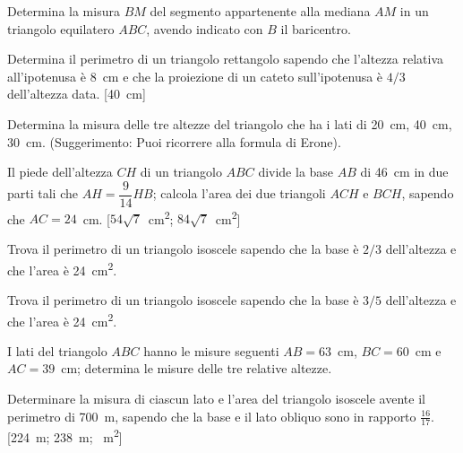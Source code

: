 \begin{multicols}{2}
\begin{esercizio}
\label{ese:7.77}
Determina la misura $BM$ del segmento appartenente alla mediana $AM$ in un triangolo equilatero $ABC$, avendo indicato con $B$ il baricentro. 
\end{esercizio}

\begin{esercizio}
\label{ese:7.78}
Determina il perimetro di un triangolo rettangolo sapendo che l'altezza relativa all'ipotenusa è 8~cm e che la proiezione di un cateto sull'ipotenusa è $4/3$ dell'altezza data.
[40~cm]
\end{esercizio}

\begin{esercizio}
\label{ese:7.79}
Determina la misura delle tre altezze del triangolo che ha i lati di 20~cm, 40~cm, 30~cm. (Suggerimento: Puoi ricorrere alla formula di Erone).
\end{esercizio}

\begin{esercizio}
\label{ese:7.80}
Il piede dell'altezza $CH$ di un triangolo $ABC$ divide la base $AB$ di 46~cm in due parti tali che $AH=\dfrac{9}{14}HB$; calcola l'area dei due triangoli $ACH$ e $BCH$, sapendo che $AC=24$~cm.
[$54\sqrt{7}$~cm\textsuperscript{2}; $84\sqrt{7}$~cm\textsuperscript{2}]
\end{esercizio}

\begin{esercizio}
\label{ese:7.81}
Trova il perimetro di un triangolo isoscele sapendo che la base è $2/3$ dell'altezza e che l'area è 24~cm\textsuperscript{2}.
\end{esercizio}

\begin{esercizio}
\label{ese:7.82}
Trova il perimetro di un triangolo isoscele sapendo che la base è $3/5$ dell'altezza e che l'area è 24~cm\textsuperscript{2}.
\end{esercizio}

\begin{esercizio}
\label{ese:7.83}
I lati del triangolo $ABC$ hanno le misure seguenti $AB=63$~cm, $BC=60$~cm e $AC=39$~cm; determina le misure delle tre relative altezze.
\end{esercizio}

\begin{esercizio}
\label{ese:7.84}
Determinare la misura di ciascun lato e l'area del triangolo isoscele avente il perimetro di 700~m, sapendo che la base e il lato obliquo sono in rapporto $\frac{16}{17}$.
[224~m; 238~m; ~m\textsuperscript{2}]
\end{esercizio}


\end{multicols}

